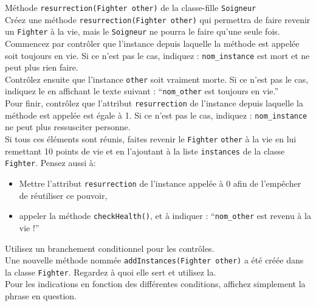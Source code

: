 \begin{Exercice}[15 minutes] Méthode \lstinline{resurrection(Fighter other)} de la classe-fille \lstinline{Soigneur} \\
Créez une méthode \lstinline{resurrection(Fighter other)} qui permettra de faire revenir un \lstinline{Fighter} à la vie, mais le \lstinline{Soigneur} ne pourra le faire qu'une seule fois. \\

Commencez par contrôler que l'instance depuis laquelle la méthode est appelée soit toujours en vie. Si ce n'est pas le cas, indiquez : \lstinline{nom_instance} est mort et ne peut plus rien faire.  \\ 

Contrôlez ensuite que l'instance \lstinline{other} soit vraiment morte. Si ce n'est pas le cas, indiquez le en affichant le texte suivant : ``\lstinline{nom_other} est toujours en vie.'' \\

Pour finir, contrôlez que l'attribut \lstinline{resurrection} de l'instance depuis laquelle la méthode est appelée est égale à 1. Si ce n'est pas le cas, indiquez : \lstinline{nom_instance} ne peut plus ressusciter personne.\\

Si tous ces éléments sont réunis, faites revenir le \lstinline{Fighter} \lstinline{other} à la vie en lui remettant 10 points de vie et en l'ajoutant à la liste \lstinline{instances} de la classe \lstinline{Fighter}. Pensez aussi à:

\begin{itemize}
	\item Mettre l'attribut \lstinline{resurrection} de l'instance appelée à 0 afin de l'empêcher de réutiliser ce pouvoir,
	\item appeler la méthode \lstinline{checkHealth()}, et à indiquer : ``\lstinline{nom_other} est revenu à la vie !''
\end{itemize}

\begin{conseil}
Utilisez un branchement conditionnel pour les contrôles. \\

Une nouvelle méthode nommée \lstinline{addInstances(Fighter other)} a été créée dans la classe \lstinline{Fighter}. Regardez à quoi elle sert et utilisez la. \\

Pour les indications en fonction des différentes conditions, affichez simplement la phrase en question. \\
\end{conseil}

\begin{solution}
	
\end{solution}

\end{Exercice}

